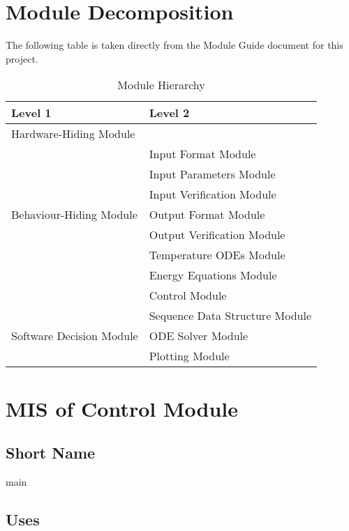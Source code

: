 \documentclass[12pt]{article}
\begin{document}
\section{Module Decomposition}

The following table is taken directly from the Module Guide document for this project.

\begin{table}[!h]
	\centering
	\begin{tabular}{p{} p{}}
		\toprule
		\textbf{Level 1} & \textbf{Level 2}\\
		\midrule
		
		{Hardware-Hiding Module} & ~ \\
		\midrule
		
		\multirow{7}{0.3\textwidth}{Behaviour-Hiding Module} & Input Format Module\\
		& Input Parameters Module\\
		& Input Verification Module\\
		& Output Format Module\\
		& Output Verification Module\\
		& Temperature ODEs Module\\
		& Energy Equations Module\\ 
		& Control Module\\
		\midrule
		
		\multirow{3}{0.3\textwidth}{Software Decision Module} & {Sequence Data Structure Module}\\
		& ODE Solver Module\\
		& Plotting Module\\
		\bottomrule
		
	\end{tabular}
	\caption{Module Hierarchy}
	\label{TblMH}
\end{table}

\section{MIS of Control Module} \label{Main}

\subsection{Short Name}

main

\subsection{Uses}
\end{document}

